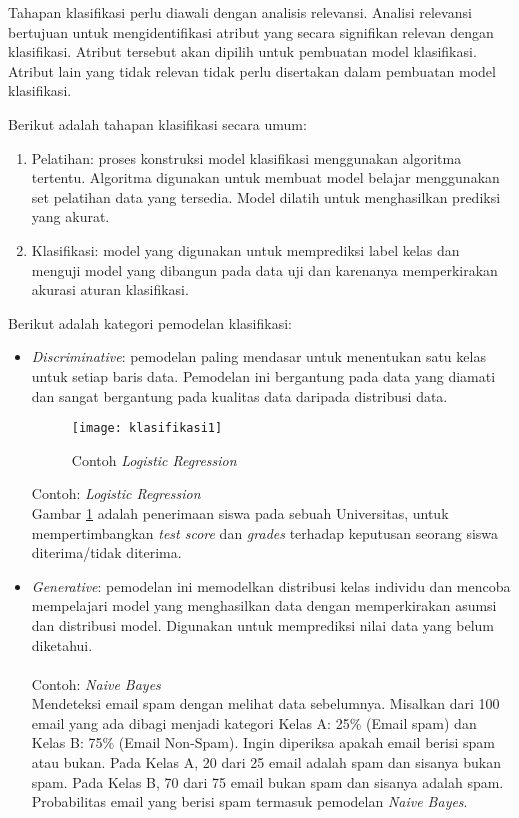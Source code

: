 Tahapan klasifikasi perlu diawali dengan analisis relevansi. Analisi relevansi bertujuan untuk mengidentifikasi atribut yang secara signifikan relevan dengan klasifikasi. Atribut tersebut akan dipilih untuk pembuatan model klasifikasi. Atribut lain yang tidak relevan tidak perlu disertakan dalam pembuatan model klasifikasi.\cite{jiawei:12:datmin}

\noindent Berikut adalah tahapan klasifikasi secara umum:
\begin{enumerate}

\item
Pelatihan: proses konstruksi model klasifikasi menggunakan algoritma tertentu. Algoritma digunakan untuk membuat model belajar menggunakan set pelatihan data yang tersedia. Model dilatih untuk menghasilkan prediksi yang akurat.

\item
Klasifikasi: model yang digunakan untuk memprediksi label kelas dan menguji model yang dibangun pada data uji dan karenanya memperkirakan akurasi aturan klasifikasi.
\end{enumerate}
\vspace{0.3cm}
\noindent Berikut adalah kategori pemodelan klasifikasi:
\begin{itemize}

\item 
\textit{Discriminative}: pemodelan paling mendasar untuk menentukan satu kelas untuk setiap baris data. Pemodelan ini bergantung pada data yang diamati dan sangat bergantung pada kualitas data daripada distribusi data.

\begin{figure}[H]
	\centering
	\texttt{[image: klasifikasi1]}
	\caption{Contoh \textit{Logistic Regression}}
	\label{fig:klasifikasi1}
\end{figure}

Contoh: \textit{Logistic Regression}\\
Gambar \ref{fig:klasifikasi1} adalah penerimaan siswa pada sebuah Universitas, untuk mempertimbangkan \textit{test score} dan \textit{grades} terhadap keputusan seorang siswa diterima/tidak diterima.

\item 
\textit{Generative}: pemodelan ini memodelkan distribusi kelas individu dan mencoba mempelajari model yang menghasilkan data dengan memperkirakan asumsi dan distribusi model. Digunakan untuk memprediksi nilai data yang belum diketahui. \\\\
Contoh: \textit{Naive Bayes} \\
Mendeteksi email spam dengan melihat data sebelumnya. Misalkan dari 100 email yang ada dibagi menjadi kategori Kelas A: 25\% (Email spam) dan Kelas B: 75\% (Email Non-Spam). Ingin diperiksa apakah email berisi  spam atau bukan. Pada Kelas A, 20 dari 25 email adalah spam dan sisanya bukan spam. Pada Kelas B, 70 dari 75 email bukan spam dan sisanya adalah spam. Probabilitas email yang berisi spam termasuk pemodelan \textit{Naive Bayes}. \\
\end{itemize}

